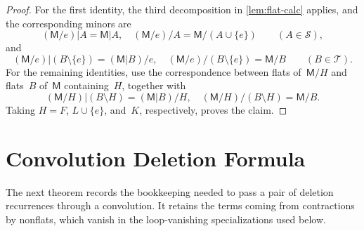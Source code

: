 \documentclass[12pt,letterpaper,english]{amsart}
\theoremstyle{teoremas}
\theoremstyle{definition}
\newcommand{\M}{\mathsf{M}}
\begin{document}
\begin{proof}
For the first identity, the third decomposition in \cref{lem:flat-calc}
applies, and the corresponding minors are
\[
(\M/e)|A = \M|A,\quad (\M/e)/A = \M/(A \cup \{e\})
\qquad (A \in \mathcal{S}),
\]
and
\[
(\M/e)|(B \setminus \{e\}) = (\M|B)/e,\quad
(\M/e)/(B \setminus \{e\}) = \M/B
\qquad (B \in \mathcal{T}).
\]
For the remaining identities, use the correspondence between flats
of~$\M/H$ and flats~$B$ of~$\M$ containing~$H$, together with
\[
(\M/H)|(B \setminus H) = (\M|B)/H,\quad
(\M/H)/(B \setminus H) = \M/B.
\]
Taking $H = F$, $L \cup \{e\}$, and~$K$, respectively, proves the claim.
\end{proof}


\section{Convolution Deletion Formula}

The next theorem records the bookkeeping needed to pass a pair of
deletion recurrences through a convolution.  It retains the terms
coming from contractions by nonflats, which vanish in the
loop-vanishing specializations used below.
\end{document}
